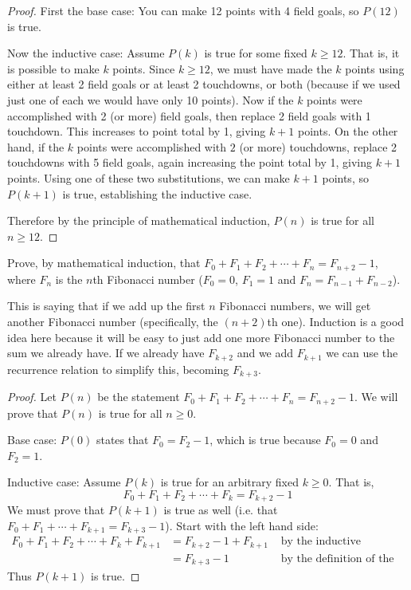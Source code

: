 \documentclass[11pt]{exam}
\begin{document}
\begin{questions}
\begin{solution}
\begin{proof}
    First the base case: You can make 12 points with 4 field goals, so $P(12)$ is true.
    
    Now the inductive case: Assume $P(k)$ is true for some fixed $k \ge 12$.  That is, it is possible to make $k$ points.  Since $k \ge 12$, we must have made the $k$ points using either at least 2 field goals or at least 2 touchdowns, or both (because if we used just one of each we would have only 10 points).  Now if the $k$ points were accomplished with 2 (or more) field goals, then replace 2 field goals with 1 touchdown.  This increases to point total by 1, giving $k + 1$ points.  On the other hand, if the $k$ points were accomplished with $2$ (or more) touchdowns, replace 2 touchdowns with 5 field goals, again increasing the point total by 1, giving $k+1$ points.  Using one of these two substitutions, we can make $k+1$ points, so $P(k+1)$ is true, establishing the inductive case.
    
    Therefore by the principle of mathematical induction, $P(n)$ is true for all $n \ge 12$.
  \end{proof}
\end{solution}


\question[6] Prove, by mathematical induction, that $F_0 + F_1 + F_2 + \cdots + F_{n} = F_{n+2} - 1$, where $F_n$ is the $n$th Fibonacci number ($F_0 = 0$, $F_1 = 1$ and $F_n = F_{n-1} + F_{n-2}$).
\begin{solution}
 This is saying that if we add up the first $n$ Fibonacci numbers, we will get another Fibonacci number (specifically, the $(n+2)$th one).  Induction is a good idea here because it will be easy to just add one more Fibonacci number to the sum we already have.  If we already have $F_{k+2}$ and we add $F_{k+1}$ we can use the recurrence relation to simplify this, becoming $F_{k+3}$.  
 
  \begin{proof}
    Let $P(n)$ be the statement $F_0 + F_1 + F_2 + \cdots + F_n = F_{n+2} - 1$.  We will prove that $P(n)$ is true for all $n \ge 0$.  
    
    Base case: $P(0)$ states that $F_0 = F_2 - 1$, which is true because $F_0 = 0$ and $F_2 = 1$.
    
    Inductive case:  Assume $P(k)$ is true for an arbitrary fixed $k \ge 0$.  That is, \[F_0 + F_1 + F_2 + \cdots + F_k = F_{k+2} - 1\]
    We must prove that $P(k+1)$ is true as well (i.e. that $F_0 + F_1 + \cdots +F_{k+1} = F_{k+3} - 1$).  Start with the left hand side:
    \begin{align*}
      F_0 + F_1 + F_2 + \cdots + F_k + F_{k+1} & = F_{k+2} - 1 + F_{k+1} & \mbox{ by the inductive hypothesis}\\
      & = F_{k+3} - 1 & \mbox{ by the definition of the Fibonacci numbers}
    \end{align*}
    Thus $P(k+1)$ is true.
    

\end{proof}
\end{solution}
\end{questions}
\end{document}
